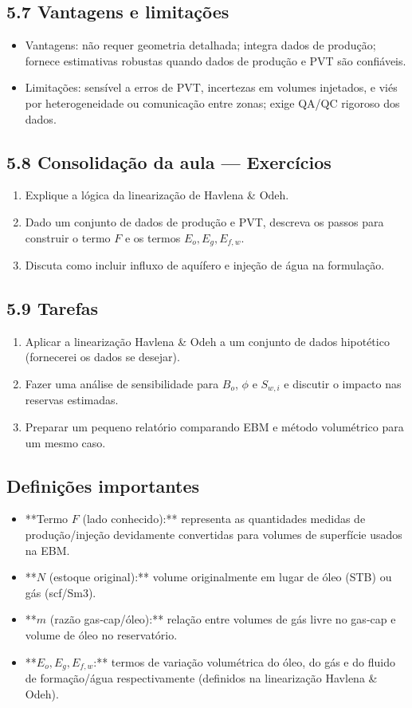 \documentclass[11pt,a4paper]{article}
\begin{document}
\subsection{5.7 Vantagens e limitações}
\begin{itemize}
\item Vantagens: não requer geometria detalhada; integra dados de produção; fornece estimativas robustas quando dados de produção e PVT são confiáveis.
\item Limitações: sensível a erros de PVT, incertezas em volumes injetados, e viés por heterogeneidade ou comunicação entre zonas; exige QA/QC rigoroso dos dados.
\end{itemize}

\subsection{5.8 Consolidação da aula — Exercícios}
\begin{enumerate}
\item Explique a lógica da linearização de Havlena & Odeh.
\item Dado um conjunto de dados de produção e PVT, descreva os passos para construir o termo $F$ e os termos $E_o,E_g,E_{f,w}$.
\item Discuta como incluir influxo de aquífero e injeção de água na formulação.
\end{enumerate}

\subsection{5.9 Tarefas}
\begin{enumerate}
\item Aplicar a linearização Havlena & Odeh a um conjunto de dados hipotético (fornecerei os dados se desejar).
\item Fazer uma análise de sensibilidade para $B_o$, $\phi$ e $S_{w,i}$ e discutir o impacto nas reservas estimadas.
\item Preparar um pequeno relatório comparando EBM e método volumétrico para um mesmo caso.
\end{enumerate}

\subsection{Definições importantes}
\begin{itemize}
\item **Termo $F$ (lado conhecido):** representa as quantidades medidas de produção/injeção devidamente convertidas para volumes de superfície usados na EBM.
\item **$N$ (estoque original):** volume originalmente em lugar de óleo (STB) ou gás (scf/Sm3).
\item **$m$ (razão gas‑cap/óleo):** relação entre volumes de gás livre no gas‑cap e volume de óleo no reservatório.
\item **$E_o, E_g, E_{f,w}$:** termos de variação volumétrica do óleo, do gás e do fluido de formação/água respectivamente (definidos na linearização Havlena & Odeh).
\end{itemize}
\end{document}
